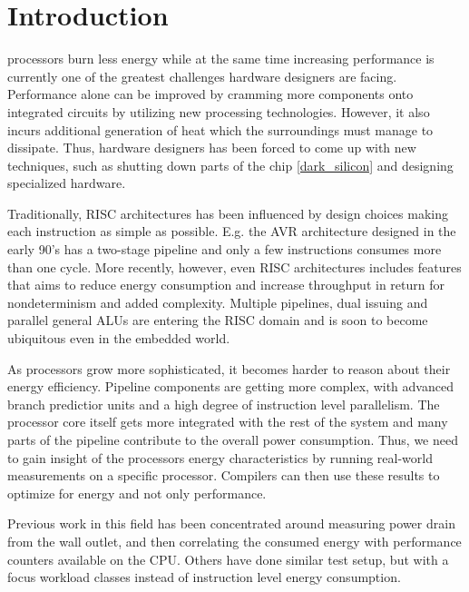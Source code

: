 \section{Introduction}

 processors burn less energy while at the same time
increasing performance is currently one of the greatest challenges hardware
designers are facing. Performance alone can be improved by cramming more
components onto integrated circuits \cite{moore1965cramming} by utilizing new
processing technologies. However, it also incurs additional generation of heat
which the surroundings must manage to dissipate. Thus, hardware designers has
been forced to come up with new techniques, such as shutting down parts of the
chip \ref{dark_silicon} and designing specialized hardware.

Traditionally, RISC architectures has been influenced by design choices making
each instruction as simple as possible\cite{sivarama}. E.g. the AVR architecture
designed in the early 90's has a two-stage pipeline and only a few instructions
consumes more than one cycle. More recently, however, even RISC architectures
includes features that aims to reduce energy consumption and increase throughput
in return for nondeterminism and added complexity. Multiple pipelines, dual
issuing and parallel general ALUs are entering the RISC domain and is soon to
become ubiquitous even in the embedded world.

As processors grow more sophisticated, it becomes harder to reason about their
energy efficiency. Pipeline components are getting more complex, with advanced
branch predictior units and a high degree of instruction level parallelism. The
processor core itself gets more integrated with the rest of the system and many
parts of the pipeline contribute to the overall power consumption\cite{bertran}.
Thus, we need to gain insight of the processors energy characteristics by
running real-world measurements on a specific processor. Compilers can then use
these results to optimize for energy and not only performance.


Previous work in this field has been concentrated around measuring power drain
from the wall outlet, and then correlating the consumed energy with performance
counters available on the CPU\cite{singh}\cite{bertran}\cite{bircher}. Others
have done similar test setup, but with a focus workload classes instead of
instruction level energy consumption\cite{carroll2010analysis}.

